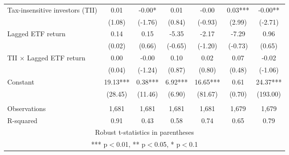 \documentclass[]{article}
\begin{document}
\begin{tabular}{lcccccc}
Tax-insensitive investors (TII) & 0.01 & -0.00* & 0.01 & -0.00 & 0.03*** & -0.00** \\
 & (1.08) & (-1.76) & (0.84) & (-0.93) & (2.99) & (-2.71) \\
Lagged ETF return & 0.14 & 0.15 & -5.35 & -2.17 & -7.29 & 0.96 \\
 & (0.02) & (0.66) & (-0.65) & (-1.20) & (-0.73) & (0.65) \\
TII $\times$ Lagged ETF return & 0.00 & -0.00 & 0.10 & 0.02 & 0.07 & -0.02 \\
 & (0.04) & (-1.24) & (0.87) & (0.80) & (0.48) & (-1.06) \\
Constant & 19.13*** & 0.38*** & 6.92*** & 16.65*** & 0.61 & 24.37*** \\
 & (28.45) & (11.46) & (6.90) & (81.67) & (0.70) & (193.00) \\
 &  &  &  &  &  &  \\
Observations & 1,681 & 1,681 & 1,681 & 1,681 & 1,679 & 1,679 \\
 R-squared & 0.91 & 0.43 & 0.58 & 0.74 & 0.65 & 0.79 \\ \hline
\multicolumn{7}{c}{ Robust t-statistics in parentheses} \\
\multicolumn{7}{c}{ *** p$<$0.01, ** p$<$0.05, * p$<$0.1} \\
\end{tabular}
\end{document}
